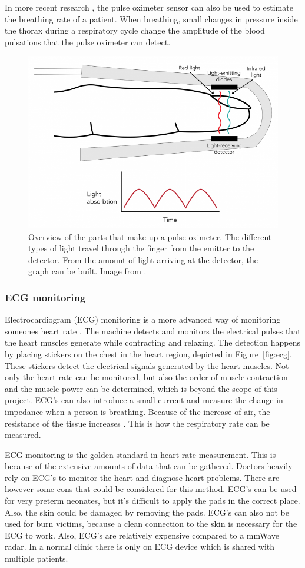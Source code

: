In more recent research \cite{motin2019selection}, the pulse oximeter sensor can also be used to estimate the breathing rate of a patient. When breathing, small changes in pressure inside the thorax during a respiratory cycle change the amplitude of the blood pulsations that the pulse oximeter can detect.

\begin{figure}[t]
\centering
\includegraphics[width=.7\textwidth]{figures/background/pulse_oximeter.png}
\caption{Overview of the parts that make up a pulse oximeter. The different types of light travel through the finger from the emitter to the detector. From the amount of light arriving at the detector, the graph can be built. Image from \cite{pulse_oximeter_website}.}
\label{fig:pulse_oxymeter}
\end{figure}

\subsubsection{ECG monitoring}
Electrocardiogram (ECG) monitoring is a more advanced way of monitoring someones heart rate \cite{berkaya2018survey}. The machine detects and monitors the electrical pulses that the heart muscles generate while contracting and relaxing. The detection happens by placing stickers on the chest in the heart region, depicted in Figure~\ref{fig:ecg}. These stickers detect the electrical signals generated by the heart muscles. Not only the heart rate can be monitored, but also the order of muscle contraction and the muscle power can be determined, which is beyond the scope of this project. ECG's can also introduce a small current and measure the change in impedance when a person is breathing. Because of the increase of air, the resistance of the tissue increases \cite{charlton2017breathing}. This is how the respiratory rate can be measured.

ECG monitoring is the golden standard in heart rate measurement. This is because of the extensive amounts of data that can be gathered. Doctors heavily rely on ECG's to monitor the heart and diagnose heart problems. There are however some cons that could be considered for this method. ECG's can be used for very preterm neonates, but it's difficult to apply the pads in the correct place. Also, the skin could be damaged by removing the pads. ECG's can also not be used for burn victims, because a clean connection to the skin is necessary for the ECG to work. Also, ECG's are relatively expensive compared to a mmWave radar. In a normal clinic there is only on ECG device which is shared with multiple patients.


